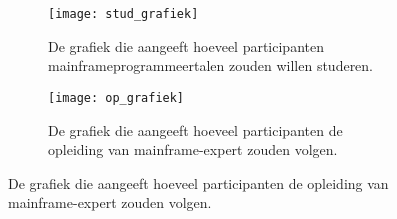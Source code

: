 \begin{figure}[h]
    \centering
    \begin{subfigure}{0.45\textwidth}
        \texttt{[image: stud\_grafiek]}
        \caption{De grafiek die aangeeft hoeveel participanten mainframeprogrammeertalen zouden willen studeren.}
    \end{subfigure}
    \hfill
    \begin{subfigure}{0.45\textwidth}
        \texttt{[image: op\_grafiek]}
        \caption{De grafiek die aangeeft hoeveel participanten de opleiding van mainframe-expert zouden volgen.}
    \end{subfigure}
\end{figure}



